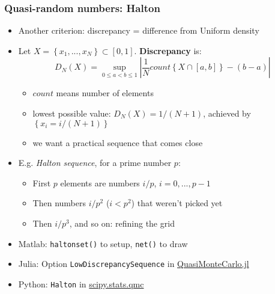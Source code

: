 \documentclass[bigger,handout]{beamer}
\begin{document}
\begin{frame}%

\frametitle{Quasi-random numbers: Halton}

\begin{itemize}
\item Another criterion: discrepancy = difference from Uniform density

\item Let $X=\left\{ x_{1},...,x_{N}\right\} \subset \left[ 0,1\right] $. 
\textbf{Discrepancy} is: 
\begin{equation*}
D_{N}\left( X\right) =\sup_{0\leq a<b\leq 1}\left\vert \frac{1}{N}%
count\left\{ X\cap \left[ a,b\right] \right\} -\left( b-a\right) \right\vert
\end{equation*}

\begin{itemize}
\item $count$ means number of elements

\item lowest possible value: $D_{N}\left( X\right) =1/\left( N+1\right) $, 
\newline
achieved by $\left\{ x_{i}=i/\left( N+1\right) \right\} $

\item we want a practical sequence that comes close
\end{itemize}

\item E.g. \emph{Halton sequence}, for a prime number $p$:

\begin{itemize}
\item First $p$ elements are numbers $i/p$, $i=0,...,p-1$

\item Then numbers $i/p^{2}$ ($i<p^{2}$) that weren't picked yet

\item Then $i/p^{3}$, and so on: refining the grid
\end{itemize}

\item Matlab: \texttt{haltonset()} to setup, \texttt{net()} to draw
\item Julia: Option \texttt{LowDiscrepancySequence} in \href{https://github.com/SciML/QuasiMonteCarlo.jl}{QuasiMonteCarlo.jl}
\item Python: \texttt{Halton} in \href{https://docs.scipy.org/doc/scipy/reference/stats.qmc.html}{scipy.stats.qmc}
\end{itemize}


\end{frame}%
\end{document}
